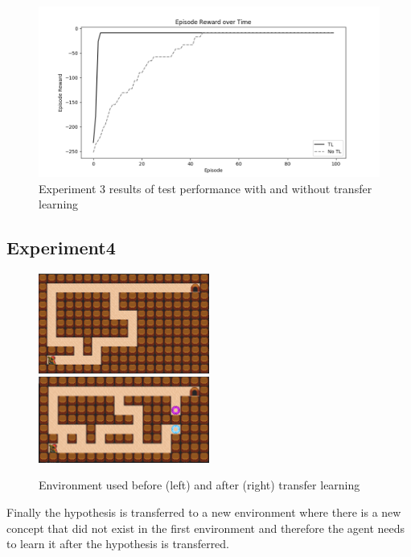 \begin{figure}[!htb]
\centering
\includegraphics[width=1.0\textwidth]{./figures/experiment4_after_test}
\caption{Experiment 3 results of test performance with and without transfer learning}
\label{experiment3_test}
\end{figure}

\subsection{Experiment4}

\begin{figure}[!htb]
\centerline{
\includegraphics[width=0.5\textwidth]{./figures/experiment4_before}
\includegraphics[width=0.5\textwidth]{./figures/experiment5_after}}
\caption{Environment used before (left) and after (right) transfer learning}
\label{experiment5}
\end{figure}

Finally the hypothesis is transferred to a new environment where there is a new concept that did not exist in the first environment
and therefore the agent needs to learn it after the hypothesis is transferred.

